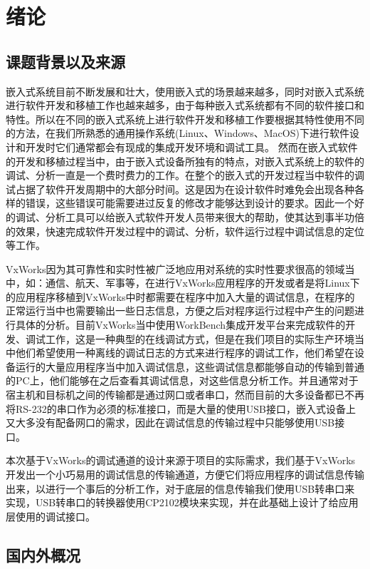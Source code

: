 \chapter{绪论}
\section{课题背景以及来源}
	嵌入式系统目前不断发展和壮大，使用嵌入式的场景越来越多，同时对嵌入式系统进行软件开发和移植工作也越来越多，由于每种嵌入式系统都有不同的软件接口和特性。所以在不同的嵌入式系统上进行软件开发和移植工作要根据其特性使用不同的方法，在我们所熟悉的通用操作系统(Linux、Windows、MacOS)下进行软件设计和开发时它们通常都会有现成的集成开发环境和调试工具。
	然而在嵌入式软件的开发和移植过程当中，由于嵌入式设备所独有的特点，对嵌入式系统上的软件的调试、分析一直是一个费时费力的工作。在整个的嵌入式的开发过程当中软件的调试占据了软件开发周期中的大部分时间。这是因为在设计软件时难免会出现各种各样的错误，这些错误可能需要进过反复的修改才能够达到设计的要求。因此一个好的调试、分析工具可以给嵌入式软件开发人员带来很大的帮助，使其达到事半功倍的效果，快速完成软件开发过程中的调试、分析，软件运行过程中调试信息的定位等工作。
	
	VxWorks因为其可靠性和实时性被广泛地应用对系统的实时性要求很高的领域当中，如：通信、航天、军事等\cite{刘小军2008基于}，在进行VxWorks应用程序的开发或者是将Linux下的应用程序移植到VxWorks中时都需要在程序中加入大量的调试信息，在程序的正常运行当中也需要输出一些日志信息，方便之后对程序运行过程中产生的问题进行具体的分析。目前VxWorks当中使用WorkBench集成开发平台来完成软件的开发、调试工作，这是一种典型的在线调试方式\cite{陈洋2007VxWorks}\cite{张鹏2007基于}，但是在我们项目的实际生产环境当中他们希望使用一种离线的调试日志的方式来进行程序的调试工作，他们希望在设备运行的大量应用程序当中加入调试信息，这些调试信息都能够自动的传输到普通的PC上，他们能够在之后查看其调试信息，对这些信息分析工作。并且通常对于宿主机和目标机之间的传输都是通过网口或者串口，然而目前的大多设备都已不再将RS-232的串口作为必须的标准接口，而是大量的使用USB接口，嵌入式设备上又大多没有配备网口的需求，因此在调试信息的传输过程中只能够使用USB接口。
	
	本次基于VxWorks的调试通道的设计来源于项目的实际需求，我们基于VxWorks开发出一个小巧易用的调试信息的传输通道，方便它们将应用程序的调试信息传输出来，以进行一个事后的分析工作，对于底层的信息传输我们使用USB转串口来实现，USB转串口的转换器使用CP2102模块来实现，并在此基础上设计了给应用层使用的调试接口。
	
			
\section{国内外概况}
	
